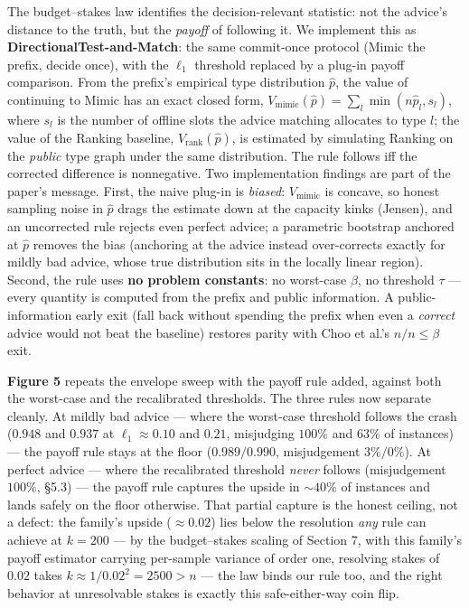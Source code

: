 The budget--stakes law identifies the decision-relevant statistic: not
the advice's distance to the truth, but the \emph{payoff} of following
it. We implement this as \textbf{DirectionalTest-and-Match}: the same
commit-once protocol (Mimic the prefix, decide once), with the
\(\ell_1\) threshold replaced by a plug-in payoff comparison. From the
prefix's empirical type distribution \(\hat p\), the value of continuing
to Mimic has an exact closed form,
\(V_{\mathrm{mimic}}(\hat p)=\sum_l \min(n\hat p_l, s_l)\), where
\(s_l\) is the number of offline slots the advice matching allocates to
type \(l\); the value of the Ranking baseline,
\(V_{\mathrm{rank}}(\hat p)\), is estimated by simulating Ranking on the
\emph{public} type graph under the same distribution. The rule follows
iff the corrected difference is nonnegative. Two implementation findings
are part of the paper's message. First, the naive plug-in is
\emph{biased}: \(V_{\mathrm{mimic}}\) is concave, so honest sampling
noise in \(\hat p\) drags the estimate down at the capacity kinks
(Jensen), and an uncorrected rule rejects even perfect advice; a
parametric bootstrap anchored at \(\hat p\) removes the bias (anchoring
at the advice instead over-corrects exactly for mildly bad advice, whose
true distribution sits in the locally linear region). Second, the rule
uses \textbf{no problem constants}: no worst-case \(\beta\), no
threshold \(\tau\) --- every quantity is computed from the prefix and
public information. A public-information early exit (fall back without
spending the prefix when even a \emph{correct} advice would not beat the
baseline) restores parity with Choo et al.'s \(\hat n/n\le\beta\) exit.

\textbf{Figure 5} repeats the envelope sweep with the payoff rule added,
against both the worst-case and the recalibrated thresholds. The three
rules now separate cleanly. At mildly bad advice --- where the
worst-case threshold follows the crash (\(0.948\) and \(0.937\) at
\(\ell_1\approx0.10\) and \(0.21\), misjudging \(100\%\) and \(63\%\) of
instances) --- the payoff rule stays at the floor (\(0.989/0.990\),
misjudgement \(3\%/0\%\)). At perfect advice --- where the recalibrated
threshold \emph{never} follows (misjudgement \(100\%\), §5.3) --- the
payoff rule captures the upside in \({\sim}40\%\) of instances and lands
safely on the floor otherwise. That partial capture is the honest
ceiling, not a defect: the family's upside (\(\approx0.02\)) lies below
the resolution \emph{any} rule can achieve at \(k=200\) --- by the
budget--stakes scaling of Section 7, with this family's payoff estimator
carrying per-sample variance of order one, resolving stakes of \(0.02\)
takes \(k \approx 1/0.02^2 = 2500 > n\) --- the law binds our rule too,
and the right behavior at unresolvable stakes is exactly this
safe-either-way coin flip.

